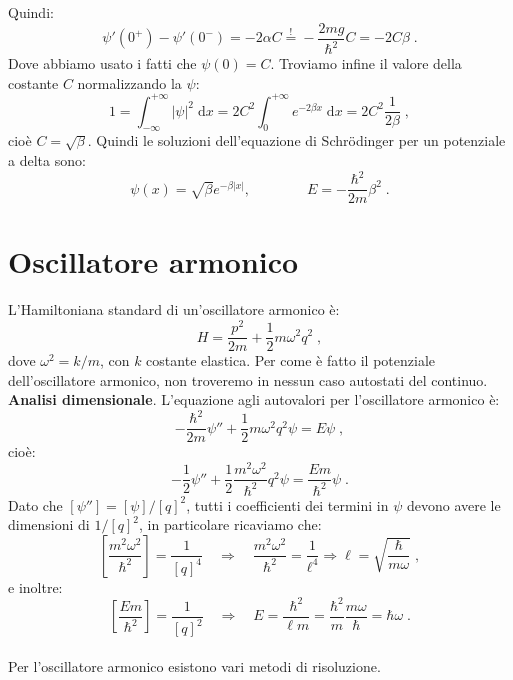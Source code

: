 \documentclass[12pt,a4paper]{report}
\theoremstyle{definition}
\numberwithin{equation}{section}
\newcommand{\diff}[1][]{\mathrm{d}#1}
\newcommand{\Sch}{Schrödinger}
\begin{document}
Quindi:
$$
\psi'(0^+)-\psi'(0^-)=-2\alpha C\stackrel{!}{=}-\frac{2mg}{\hbar^2}C=-2C\beta\;.
$$
Dove abbiamo usato i fatti che $\psi(0)=C$. Troviamo infine il valore della costante $C$ normalizzando la $\psi$:
\begin{equation}
1=\int_{-\infty}^{+\infty}|\psi|^2\;\diff{x}=2C^2\int_0^{+\infty}e^{-2\beta x}\;\diff{x}=2C^2\frac{1}{2\beta}\;,
\end{equation}
cioè $C=\sqrt{\beta}$. Quindi le soluzioni dell'equazione di \Sch\; per un potenziale a delta sono:
\begin{equation}
\psi(x)=\sqrt{\beta}e^{-\beta|x|},\qquad\qquad E=-\frac{\hbar^2}{2m}\beta^2\;.
\end{equation}
\chapter{Oscillatore armonico}
L'Hamiltoniana standard di un'oscillatore armonico è:
\begin{equation}
H=\frac{p^2}{2m}+\frac{1}{2}m\omega^2q^2\;, \label{ch4_harmonicham}
\end{equation}
dove $\omega^2=k/m$, con $k$ costante elastica. Per come è fatto il potenziale dell'oscillatore armonico, non troveremo in nessun caso autostati del continuo. \\
\textbf{Analisi dimensionale}. L'equazione agli autovalori per l'oscillatore armonico è:
\begin{equation}
-\frac{\hbar^2}{2m}\psi''+\frac{1}{2}m\omega^2q^2\psi=E\psi\;,
\end{equation}
cioè:
$$
-\frac{1}{2}\psi''+\frac{1}{2}\frac{m^2\omega^2}{\hbar^2}q^2\psi=\frac{Em}{\hbar^2}\psi\;.
$$
Dato che $[\psi'']=[\psi]/[q]^2$, tutti i coefficienti dei termini in $\psi$ devono avere le dimensioni di $1/[q]^2$, in particolare ricaviamo che:
\begin{equation}
\left[\frac{m^2\omega^2}{\hbar^2}\right]=\frac{1}{[q]^4}\quad \Longrightarrow\quad \frac{m^2\omega^2}{\hbar^2}=\frac{1}{\ell^4}
\Longrightarrow \ell=\sqrt{\frac{\hbar}{m\omega}}\;,
\end{equation}
e inoltre:
\begin{equation}
\left[\frac{Em}{\hbar^2}\right]=\frac{1}{[q]^2}\quad \Longrightarrow\quad E=\frac{\hbar^2}{\ell m}=\frac{\hbar^2}{m}\frac{m\omega}{\hbar}=\hbar\omega\;.
\end{equation}
\\
Per l'oscillatore armonico esistono vari metodi di risoluzione.
\end{document}
